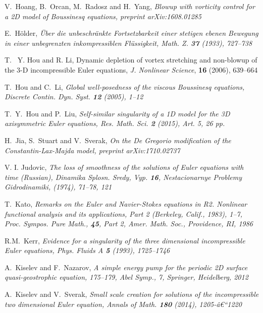 \documentclass[reqno,centertags, 11pt]{amsart}
\begin{document}
\begin{thebibliography}{99}
 V.~Hoang, B.~Orcan, M.~Radosz and H.~Yang, \it Blowup with vorticity control for a 2D model of Boussinesq equations,
\rm preprint  arXiv:1608.01285

 E.~H\"older, \it \"Uber die unbeschr\"ankte Fortsetzbarkeit einer stetigen ebenen Bewegung in einer
unbegrenzten inkompressiblen Fl\"ussigkeit, \rm Math. Z. {\bf 37} (1933), 727--738

T. ~Y. Hou and R. Li,
Dynamic depletion of vortex stretching and non-blowup of the
3-D incompressible Euler equations,
\textit{J. Nonlinear Science}, \textbf{16} (2006), 639--664

 T.~Hou and C.~Li, \it Global well-posedness of the viscous Boussinesq equations, \rm  Discrete
Contin. Dyn. Syst. {\bf 12} (2005), 1--12

 T.~Y.~Hou and P.~Liu, \it Self-similar singularity of a 1D model for the 3D axisymmetric Euler equations,
\rm Res. Math. Sci. {\bf 2} (2015), Art. 5, 26 pp.

 H.~Jia, S.~Stuart and V.~Sverak, \it On the De Gregorio modification of the Constantin-Lax-Majda model, \rm preprint arXiv:1710.02737

 V. I. Judovic, \it The loss of smoothness of the solutions of Euler equations with time (Russian), \rm
Dinamika Splosn. Sredy, Vyp. {\bf 16}, Nestacionarnye Problemy Gidrodinamiki, (1974), 71--78,
121


 T.~Kato, \it
Remarks on the Euler and Navier-Stokes equations in R2.  \rm Nonlinear functional analysis and its applications, Part 2 (Berkeley, Calif., 1983), 1--7,
Proc. Sympos. Pure Math., {\bf 45}, Part 2, Amer. Math. Soc., Providence, RI, 1986

  R.M.~Kerr, \it Evidence for a singularity of the three dimensional incompressible
Euler equations, \rm Phys. Fluids A {\bf 5} (1993), 1725--1746

 A.~Kiselev and F.~Nazarov, \it A simple energy pump for the periodic 2D surface quasi-geostrophic equation, \rm
175--179, Abel Symp., 7, Springer, Heidelberg, 2012

 A.~Kiselev and V.~Sverak, \it Small scale creation for solutions of the incompressible two dimensional Euler equation, \rm Annals of Math. {\bf 180} (2014), 1205-â€“1220


\end{thebibliography}
\end{document}
